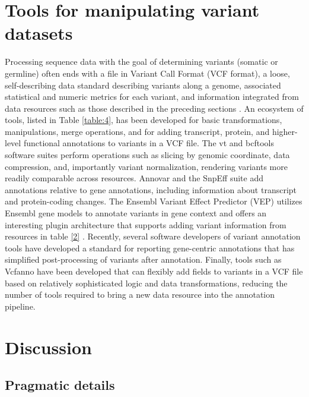 \documentclass{article}
\begin{document}
\section{Tools for manipulating variant datasets}

 

Processing sequence data with the goal of determining variants
(somatic or germline) often ends with a file in Variant Call Format
(VCF format), a loose, self-describing data standard describing
variants along a genome, associated statistical and numeric metrics
for each variant, and information integrated from data resources such
as those described in the preceding sections \parencite{Danecek2011-du}. An
ecosystem of tools, listed in Table \ref{table:4}, has been developed for basic
transformations, manipulations, merge operations, and for adding
transcript, protein, and higher-level functional annotations to
variants in a VCF file. The vt and bcftools software suites perform
operations such as slicing by genomic coordinate, data compression,
and, importantly variant normalization, rendering variants more
readily comparable across resources. Annovar
\parencite{Yang2015-bg,Wang2010-bt} and the SnpEff suite
\parencite{Cingolani2012-pt} add annotations relative to gene annotations,
including information about transcript and protein-coding
changes. The Ensembl Variant Effect Predictor (VEP) utilizes Ensembl
gene models to annotate variants in gene context and offers an
interesting plugin architecture that supports adding variant
information from resources in table \ref{2}
\parencite{McLaren2016-br}. Recently, several software developers of
variant annotation 
tools have developed a standard for reporting gene-centric annotations
that has simplified post-processing of variants after
annotation. Finally, tools such as Vcfanno \parencite{Pedersen2016-pu} have
been developed that can flexibly add fields to variants in a VCF file
based on relatively sophisticated logic and data transformations,
reducing the number of tools required to bring a new data resource
into the annotation pipeline.


\section{Discussion}

\subsection{Pragmatic details}
\end{document}
